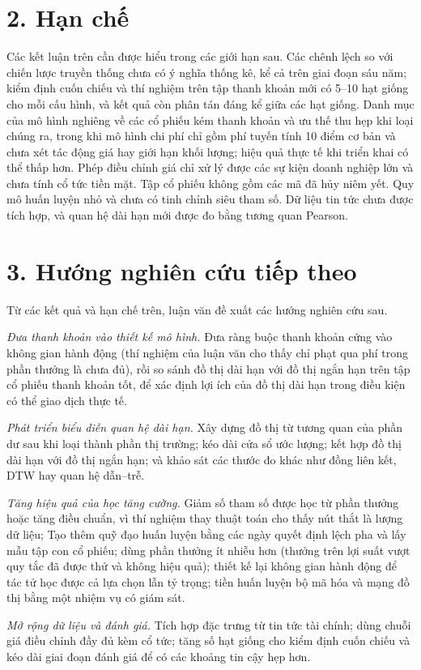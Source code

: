 \section*{2. Hạn chế}

Các kết luận trên cần được hiểu trong các giới hạn sau. Các chênh lệch so với chiến lược truyền thống chưa có ý nghĩa thống kê, kể cả trên giai đoạn sáu năm; kiểm định cuốn chiếu và thí nghiệm trên tập thanh khoản mới có 5--10 hạt giống cho mỗi cấu hình, và kết quả còn phân tán đáng kể giữa các hạt giống. Danh mục của mô hình nghiêng về các cổ phiếu kém thanh khoản và ưu thế thu hẹp khi loại chúng ra, trong khi mô hình chi phí chỉ gồm phí tuyến tính 10 điểm cơ bản và chưa xét tác động giá hay giới hạn khối lượng; hiệu quả thực tế khi triển khai có thể thấp hơn. Phép điều chỉnh giá chỉ xử lý được các sự kiện doanh nghiệp lớn và chưa tính cổ tức tiền mặt. Tập cổ phiếu không gồm các mã đã hủy niêm yết. Quy mô huấn luyện nhỏ và chưa có tinh chỉnh siêu tham số. Dữ liệu tin tức chưa được tích hợp, và quan hệ dài hạn mới được đo bằng tương quan Pearson.

\section*{3. Hướng nghiên cứu tiếp theo}

Từ các kết quả và hạn chế trên, luận văn đề xuất các hướng nghiên cứu sau.

\textit{Đưa thanh khoản vào thiết kế mô hình.} Đưa ràng buộc thanh khoản cứng vào không gian hành động (thí nghiệm của luận văn cho thấy chỉ phạt qua phí trong phần thưởng là chưa đủ), rồi so sánh đồ thị dài hạn với đồ thị ngắn hạn trên tập cổ phiếu thanh khoản tốt, để xác định lợi ích của đồ thị dài hạn trong điều kiện có thể giao dịch thực tế.

\textit{Phát triển biểu diễn quan hệ dài hạn.} Xây dựng đồ thị từ tương quan của phần dư sau khi loại thành phần thị trường; kéo dài cửa sổ ước lượng; kết hợp đồ thị dài hạn với đồ thị ngắn hạn; và khảo sát các thước đo khác như đồng liên kết, DTW hay quan hệ dẫn--trễ.

\textit{Tăng hiệu quả của học tăng cường.} Giảm số tham số được học từ phần thưởng hoặc tăng điều chuẩn, vì thí nghiệm thay thuật toán cho thấy nút thắt là lượng dữ liệu; Tạo thêm quỹ đạo huấn luyện bằng các ngày quyết định lệch pha và lấy mẫu tập con cổ phiếu; dùng phần thưởng ít nhiễu hơn (thưởng trên lợi suất vượt quy tắc đã được thử và không hiệu quả); thiết kế lại không gian hành động để tác tử học được cả lựa chọn lẫn tỷ trọng; tiền huấn luyện bộ mã hóa và mạng đồ thị bằng một nhiệm vụ có giám sát.

\textit{Mở rộng dữ liệu và đánh giá.} Tích hợp đặc trưng từ tin tức tài chính; dùng chuỗi giá điều chỉnh đầy đủ kèm cổ tức; tăng số hạt giống cho kiểm định cuốn chiếu và kéo dài giai đoạn đánh giá để có các khoảng tin cậy hẹp hơn.
